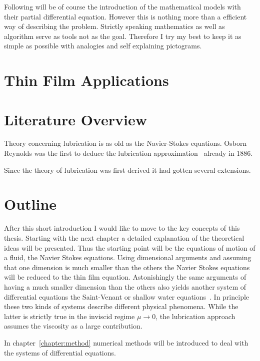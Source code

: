 Following will be of course the introduction of the mathematical models with their partial differential equation. 
However this is nothing more than a efficient way of describing the problem.
Strictly speaking mathematics as well as algorithm serve as tools not as the goal. 
Therefore I try my best to keep it as simple as possible with analogies and self explaining pictograms.

\section{Thin Film Applications}
\label{section:applications}



\section{Literature Overview}
\label{section:literature}
Theory concerning lubrication is as old as the Navier-Stokes equations. 
Osborn Reynolds was the first to deduce the lubrication approximation~\cite{ReynoldsLubr} already in 1886.

Since the theory of lubrication was first derived it had gotten several extensions.


\section{Outline}
\label{section:outline}
After this short introduction I would like to move to the key concepts of this thesis.
Starting with the next chapter a detailed explanation of the theoretical ideas will be presented.
Thus the starting point will be the equations of motion of a fluid, the Navier Stokes equations.
Using dimensional arguments and assuming that one dimension is much smaller than the others the Navier Stokes equations will be reduced to the thin film equation.
Astonishingly the same arguments of having a much smaller dimension than the others also  yields another system of differential equations the Saint-Venant or shallow water equations~\cite{saint1871theorie, williamson1992standard}.
In principle these two kinds of systems describe different physical phenomena.
While the latter is strictly true in the inviscid regime $\mu\rightarrow 0$, the lubrication approach assumes the viscosity as a large contribution.

In chapter~\ref{chapter:method} numerical methods will be introduced to deal with the systems of differential equations.





